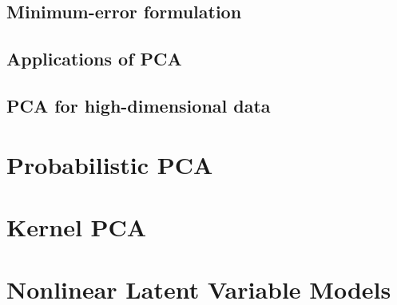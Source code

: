 \subsection{Minimum-error formulation}


\subsection{Applications of PCA}
\subsection{PCA for high-dimensional data}

\section{Probabilistic PCA}

\section{Kernel PCA}

\section{Nonlinear Latent Variable Models}